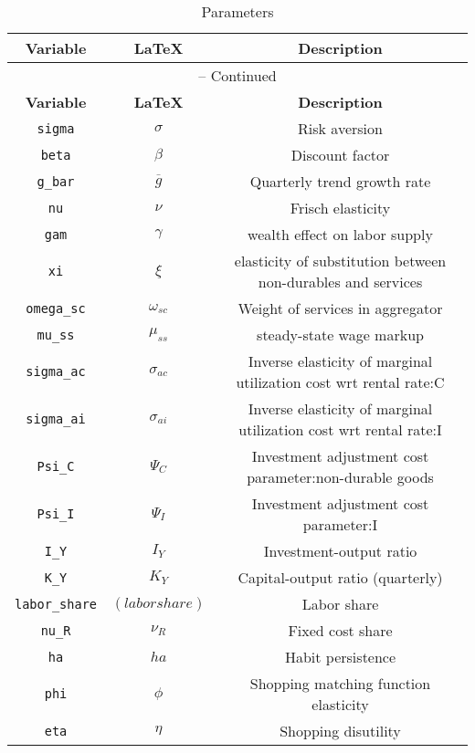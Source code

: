 \begin{center}
\begin{longtable}{ccc}
\caption{Parameters}\\%
\hline%
\multicolumn{1}{c}{\textbf{Variable}} &
\multicolumn{1}{c}{\textbf{\LaTeX}} &
\multicolumn{1}{c}{\textbf{Description}}\\%
\hline\hline%
\endfirsthead
\multicolumn{3}{c}{{\tablename} \thetable{} -- Continued}\\%
\hline%
\multicolumn{1}{c}{\textbf{Variable}} &
\multicolumn{1}{c}{\textbf{\LaTeX}} &
\multicolumn{1}{c}{\textbf{Description}}\\%
\hline\hline%
\endhead
\texttt{sigma} & ${\sigma}$ & Risk aversion\\
\texttt{beta} & ${\beta}$ & Discount factor\\
\texttt{g\_bar} & ${\overline{g}}$ & Quarterly trend growth rate\\
\texttt{nu} & $\nu$ & Frisch elasticity\\
\texttt{gam} & $\gamma$ & wealth effect on labor supply\\
\texttt{xi} & $\xi$ & elasticity of substitution between non-durables and services\\
\texttt{omega\_sc} & $\omega_{sc}$ & Weight of services in aggregator\\
\texttt{mu\_ss} & $\mu_{ss}$ & steady-state wage markup\\
\texttt{sigma\_ac} & ${\sigma_{ac}}$ & Inverse elasticity of marginal utilization cost wrt rental rate:C\\
\texttt{sigma\_ai} & ${\sigma_{ai}}$ & Inverse elasticity of marginal utilization cost wrt rental rate:I\\
\texttt{Psi\_C} & ${\Psi_{C}}$ & Investment adjustment cost parameter:non-durable goods\\
\texttt{Psi\_I} & ${\Psi_I}$ & Investment adjustment cost parameter:I\\
\texttt{I\_Y} & ${I_Y}$ & Investment-output ratio\\
\texttt{K\_Y} & ${K_Y}$ & Capital-output ratio (quarterly)\\
\texttt{labor\_share} & $(labor share)$ & Labor share\\
\texttt{nu\_R} & ${\nu_R}$ & Fixed cost share\\
\texttt{ha} & ${ha}$ & Habit persistence\\
\texttt{phi} & ${\phi}$ & Shopping matching function elasticity\\
\texttt{eta} & ${\eta}$ & Shopping disutility\\

\end{longtable}
\end{center}
